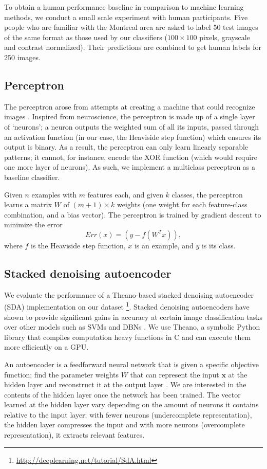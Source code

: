 \documentclass{acm_proc_article-sp}
\begin{document}
To obtain a human performance baseline in comparison to machine learning methods, we conduct a small scale experiment with human participants. Five people who are familiar with the Montreal area are asked to label 50 test images of the same format as those used by our classifiers ($100\times100$ pixels, grayscale and contrast normalized). Their predictions are combined to get human labels for 250 images.

\subsection{Perceptron}
The perceptron arose from attempts at creating a machine that could recognize images \cite{Bishop}.  Inspired from neuroscience, the perceptron is made up of a single layer of `neurons'; a neuron outputs the weighted sum of all its inputs, passed through an activation function (in our case, the Heaviside step function) which ensures its output is binary. As a result, the perceptron can only learn linearly separable patterns; it cannot, for instance, encode the XOR function (which would require one more layer of neurons). As such, we implement a multiclass perceptron as a baseline classifier.

Given $n$ examples with $m$ features each, and given $k$ classes, the perceptron learns a matrix $W$ of $(m+1) \times k$ weights (one weight for each feature-class combination, and a bias vector). The perceptron is trained by gradient descent to minimize the error $$Err(x) = (y - f(W^Tx)),$$
where $f$ is the Heaviside step function, $x$ is an example, and $y$ is its class.

\subsection{Stacked denoising autoencoder} 

We evaluate the performance of a Theano-based stacked denoising autoencoder (SDA) implementation on our dataset \footnote{\url{http://deeplearning.net/tutorial/SdA.html}}. Stacked denoising autoencoders have shown to provide significant gains in accuracy at certain image classification tasks over other models such as SVMs and DBNs \cite{vincent2010}. We use Theano\cite{Theano}, a symbolic Python library that compiles computation heavy functions in C and can execute them more efficiently on a GPU. 

An autoencoder is a feedforward neural network that is given a specific objective function; find the parameter weights $W$ that can represent the input $\mathbf{x}$ at the hidden layer and reconstruct it at the output layer \cite{larochelle}. We are interested in the contents of the hidden layer once the network has been trained. The vector learned at the hidden layer vary depending on the amount of neurons it contains relative to the input layer; with fewer neurons (undercomplete representation), the hidden layer compresses the input and with more neurons (overcomplete representation), it extracts relevant features.
\end{document}
